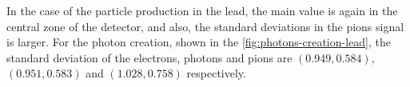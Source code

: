 In the case of the particle production in the lead, the main value is again in
the central zone of the detector, and also, the standard deviations in the
pions signal is larger. For the photon creation, shown in the
\cref{fig:photons-creation-lead}, the standard deviation of the electrons,
photons and pions are \((0.949, 0.584)\), \((0.951, 0.583)\) and \((1.028,
0.758)\) respectively.

\begin{figure}[htb!]
  \centering

  \hspace{1em}


\end{figure}
